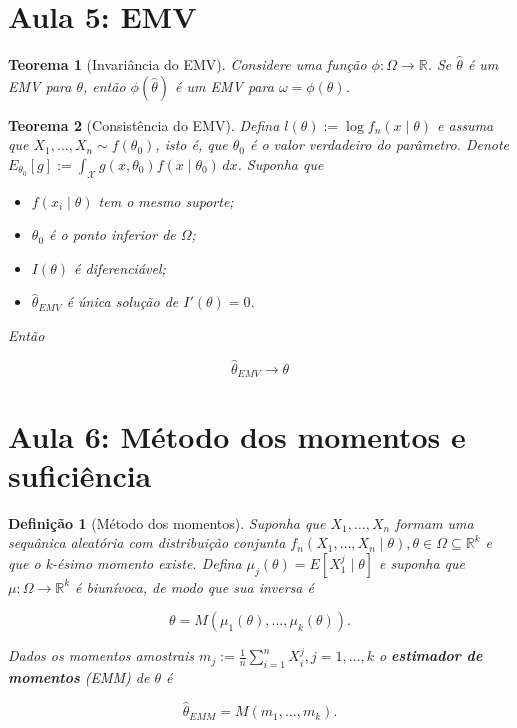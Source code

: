\documentclass{article}
\newtheorem{theorem}{Teorema}
\newtheorem{definition}{Definição}
\begin{document}
\section*{Aula 5: EMV}
\label{s5}
\begin{theorem}[Invariância do EMV]
Considere uma função $\phi: \Omega \rightarrow \mathbb{R}$. Se $\hat{\theta}$ é um EMV para $\theta$, então $\phi(\hat{\theta})$ é um EMV para $\omega = \phi(\theta)$.
\end{theorem}

\begin{theorem}[Consistência do EMV]
Defina $l(\theta) := \log f_n(x \mid \theta)$ e assuma que $X_1, \ldots, X_n \sim f(\theta_0)$, isto é, que $\theta_0$ é o valor verdadeiro do parâmetro.
Denote $E_{\theta_0}[g] := \int_{\mathcal{X}} g(x, \theta_0) f(x \mid \theta_0)\, dx$. Suponha que

\begin{itemize}
    \item $f(x_i \mid \theta)$ tem o mesmo suporte;
    \item $\theta_0$ é o ponto inferior de $\Omega$;
    \item $I(\theta)$ é diferenciável;
    \item $\hat{\theta}_{EMV}$ é única solução de $I'(\theta) = 0$.
\end{itemize}

Então

$$\hat{\theta}_{EMV} \rightarrow \theta$$

\end{theorem}

\section*{Aula 6: Método dos momentos e suficiência}
\label{s6}
\begin{definition}[Método dos momentos]
Suponha que $X_1, \ldots, X_n$ formam uma sequânica aleatória com distribuição conjunta $f_n (X_1, \ldots, X_n \mid \theta), \theta \in \Omega \subseteq \mathbb{R}^k$ e que o k-ésimo momento existe. Defina $\mu_j (\theta) = E[X_1^j \mid \theta]$ e suponha que $\mu: \Omega \rightarrow \mathbb{R}^k$ é biunívoca, de modo que sua inversa é

$$\theta = M(\mu_1(\theta), \ldots, \mu_k(\theta)).$$

Dados os momentos amostrais $m_j := \frac{1}{n} \sum_{i=1}^n X_i^j, j = 1, \ldots, k$ o \textbf{estimador de momentos} (EMM) de $\theta$ é

$$\hat{\theta}_{EMM} = M(m_1, \ldots, m_k).$$
\end{definition}
\end{document}
